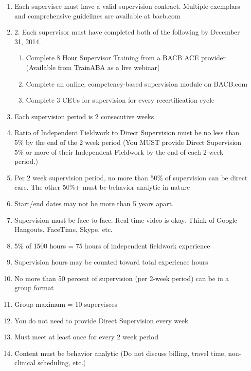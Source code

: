\begin{enumerate}
\item Each supervisee must have a valid supervision contract. Multiple exemplars and comprehensive guidelines are available at bacb.com\textregistered{}
\item    2. Each supervisor must have completed both of the following by December 31, 2014.
\begin{enumerate}
\item Complete 8 Hour Supervisor Training from a BACB\textregistered{} ACE provider (Available from TrainABA as a live webinar)
\item Complete an online, competency-based supervision module on BACB.com
\item Complete 3 CEUs for supervision for every recertification cycle
\end{enumerate}
\item Each supervision period is 2 consecutive weeks
\item Ratio of Independent Fieldwork to Direct Supervision must be no less than 5\% by the end of the 2 week period (You MUST provide Direct Supervision 5\% or more of their Independent Fieldwork by the end of each 2-week period.)
\item Per 2 week supervision period, no more than 50\% of supervision can be direct care. The other 50\%+ must be behavior analytic in nature
\item Start/end dates may not be more than 5 years apart.
\item Supervision must be face to face. Real-time video is okay. Think of Google Hangouts, FaceTime, Skype, etc.
\item 5\% of 1500 hours = 75 hours of independent fieldwork experience
\item Supervision hours may be counted toward total experience hours
\item No more than 50 percent of supervision (per 2-week period) can be in a group format
\item Group maximum = 10 supervisees
\item You do not need to provide Direct Supervision every week
\item Must meet at least once for every 2 week period
\item Content must be behavior analytic (Do not discuss billing, travel time, non-clinical scheduling, etc.)
\end{enumerate}
    
